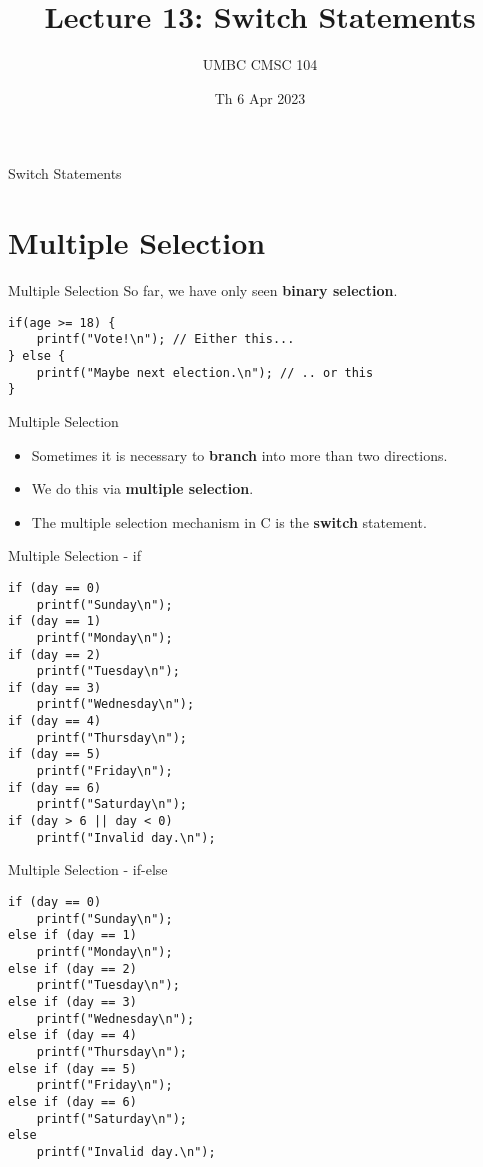 \documentclass[graphics]{beamer}
\title{Lecture 13: Switch Statements}
\author{UMBC CMSC 104}
\date{Th 6 Apr 2023}
\begin{document}
\begin{frame}{}
\centering
    Switch Statements
\end{frame}

\frame{\tableofcontents}

\section{Multiple Selection}
\begin{frame}[fragile]{Multiple Selection}
    So far, we have only seen \textbf{binary selection}.
    \begin{verbatim}
if(age >= 18) {
    printf("Vote!\n"); // Either this...
} else {
    printf("Maybe next election.\n"); // .. or this
}
    \end{verbatim}
\end{frame}

\begin{frame}{Multiple Selection}
    \begin{itemize}
        \item Sometimes it is necessary to \textbf{branch} into more than two directions.
        \item We do this via \textbf{multiple selection}.
        \item The multiple selection mechanism in C is the \textbf{switch} statement.
    \end{itemize}
\end{frame}

\begin{frame}[fragile]{Multiple Selection - if}
    \begin{verbatim}
if (day == 0)
    printf("Sunday\n");
if (day == 1)
    printf("Monday\n");
if (day == 2)
    printf("Tuesday\n");
if (day == 3)
    printf("Wednesday\n");
if (day == 4)
    printf("Thursday\n");
if (day == 5)
    printf("Friday\n");
if (day == 6)
    printf("Saturday\n");
if (day > 6 || day < 0)
    printf("Invalid day.\n");
    \end{verbatim}
\end{frame}

\begin{frame}[fragile]{Multiple Selection - if-else}
    \begin{verbatim}
if (day == 0)
    printf("Sunday\n");
else if (day == 1)
    printf("Monday\n");
else if (day == 2)
    printf("Tuesday\n");
else if (day == 3)
    printf("Wednesday\n");
else if (day == 4)
    printf("Thursday\n");
else if (day == 5)
    printf("Friday\n");
else if (day == 6)
    printf("Saturday\n");
else
    printf("Invalid day.\n");
    \end{verbatim}
\end{frame}
\end{document}
